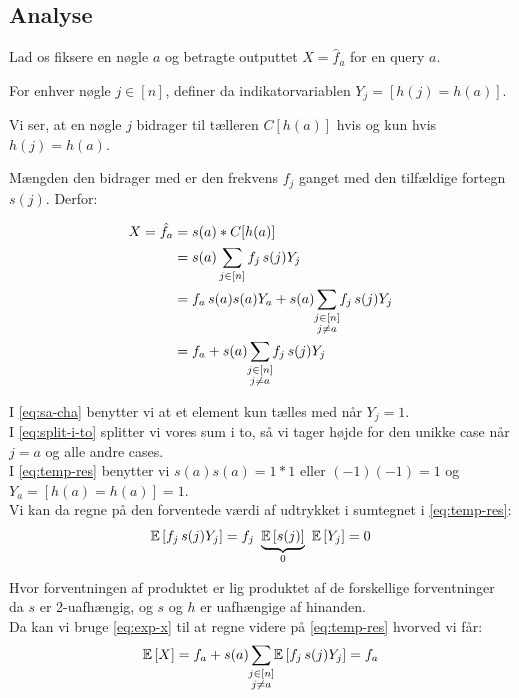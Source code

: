 \subsection{Analyse}
Lad os fiksere en nøgle $a$ og betragte outputtet $X = \hat f_a$ for en query $a$.

For enhver nøgle $j \in [n]$, definer da indikatorvariablen $Y_j = [h(j) = h(a)]$.

Vi ser, at en nøgle $j$ bidrager til tælleren $C[h(a)]$ hvis og kun hvis $h(j) = h(a)$.

Mængden den bidrager med er den frekvens $f_j$ ganget med den tilfældige fortegn $s(j)$. Derfor:

\begin{align}
  X = \hat f_a
  &= s(a) * C[h(a)] \nonumber \\
  &= s(a) \sum_{j \in [n]} f_j \, s(j) Y_j \label{eq:sa-cha} \\
  &= f_a \, s(a) s(a) Y_a + s(a) \summ{j \in [n]\\ j \neq a} f_j \, s(j) Y_j \label{eq:split-i-to} \\
  &= f_a + s(a) \summ{j \in [n]\\ j \neq a} f_j \, s(j) Y_j \label{eq:temp-res}
\end{align}

I \cref{eq:sa-cha} benytter vi at et element kun tælles med når $Y_j = 1$.\\
I \cref{eq:split-i-to} splitter vi vores sum i to, så vi tager højde for den unikke case når $j=a$ og alle andre cases.\\
I \cref{eq:temp-res} benytter vi $s(a)s(a) = 1*1$ eller $(-1)(-1) = 1$ og $Y_a = [h(a) = h(a)] = 1$.\\


Vi kan da regne på den forventede værdi af udtrykket i sumtegnet i \cref{eq:temp-res}:
\begin{align}
  \mathbb{E} \left[  f_j \, s(j) Y_j  \right]
  = f_j \ \underbrace{\mathbb{E} \left[  s(j)  \right]}_{0} \ \mathbb{E} \left[  Y_j  \right]
  = 0 \label{eq:exp-x}
\end{align}

Hvor forventningen af produktet er lig produktet af de forskellige forventninger da $s$ er 2-uafhængig, og $s$ og $h$ er uafhængige af hinanden.\\

Da kan vi bruge \cref{eq:exp-x} til at regne videre på \cref{eq:temp-res} hvorved vi får:
\begin{align}
  \E{X}
  = f_a + s(a) \summ{j \in [n]\\ j \neq a} \E{f_j \, s(j) Y_j}
  = f_a
\end{align}

